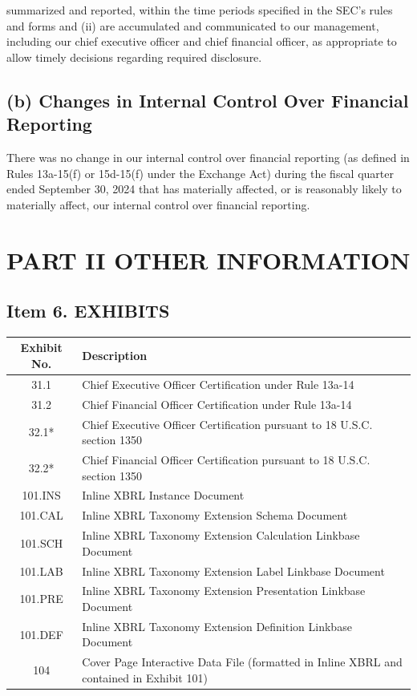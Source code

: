 \documentclass{article}\usepackage{anysize} \usepackage{multirow}\usepackage{float}\usepackage{booktabs}
\begin{document}
summarized and reported, within the time periods specified in the SEC’s rules and forms and (ii) are accumulated and communicated to our management, including our chief executive officer and chief financial officer, as appropriate to allow timely decisions regarding required disclosure.\subsection{(b) Changes in Internal Control Over Financial Reporting}There was no change in our internal control over financial reporting (as defined in Rules 13a-15(f) or 15d-15(f) under the Exchange Act) during the fiscal quarter ended September 30, 2024 that has materially affected, or is reasonably likely to materially affect, our internal control over financial reporting.\section{PART II OTHER INFORMATION}\subsection{Item 6. EXHIBITS}\begin{table}[h!]\centering\begin{tabular}{|c|l|}\hline\textbf{Exhibit No.} & \textbf{Description} \\\hline31.1 & Chief Executive Officer Certification under Rule 13a-14 \\31.2 & Chief Financial Officer Certification under Rule 13a-14 \\32.1* & Chief Executive Officer Certification pursuant to 18 U.S.C. section 1350 \\32.2* & Chief Financial Officer Certification pursuant to 18 U.S.C. section 1350 \\101.INS & Inline XBRL Instance Document \\101.CAL & Inline XBRL Taxonomy Extension Schema Document \\101.SCH & Inline XBRL Taxonomy Extension Calculation Linkbase Document \\101.LAB & Inline XBRL Taxonomy Extension Label Linkbase Document \\101.PRE & Inline XBRL Taxonomy Extension Presentation Linkbase Document \\101.DEF & Inline XBRL Taxonomy Extension Definition Linkbase Document \\104 & Cover Page Interactive Data File (formatted in Inline XBRL and contained in Exhibit 101) \\\hline\end{tabular}\end{table}\end{document} 
\end{document}
